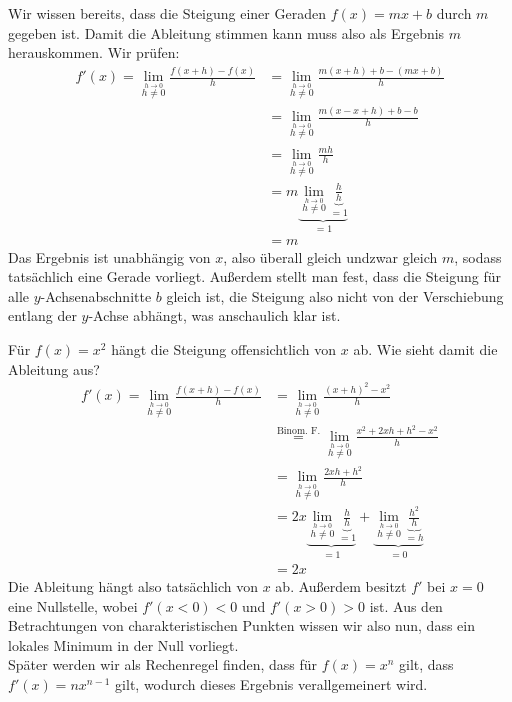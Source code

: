 \documentclass[../../main.tex]{subfiles}
\begin{document}
    \begin{example} \label{bsp:geradenAbleitungBeispiel}
        Wir wissen bereits, dass die Steigung einer Geraden $f(x) = mx + b$ durch $m$ gegeben ist. Damit die Ableitung stimmen kann muss also als Ergebnis $m$ herauskommen. Wir prüfen:
        \begin{align*}
        f'(x) = \lim\limits_{\stackrel{h\to 0}{h\neq 0}}\frac{f(x+h)-f(x)}{h} &= \lim\limits_{\stackrel{h\to 0}{h\neq 0}}\frac{m(x+h)+b-(mx+b)}{h}\\
        &= \lim\limits_{\stackrel{h\to 0}{h\neq 0}}\frac{m(x-x+h)+b-b}{h}\\
        &= \lim\limits_{\stackrel{h\to 0}{h\neq 0}}\frac{mh}{h}\\
        &= m\underbrace{\lim\limits_{\stackrel{h\to 0}{h\neq 0}}\underbrace{\frac{h}{h}}_{=1}}_{=1}\\
        &= m
        \end{align*}
        Das Ergebnis ist unabhängig von $x$, also überall gleich undzwar gleich $m$, sodass tatsächlich eine Gerade vorliegt. Außerdem stellt man fest, dass die Steigung für alle $y$-Achsenabschnitte $b$ gleich ist, die Steigung also nicht von der Verschiebung entlang der $y$-Achse abhängt, was anschaulich klar ist.
    \end{example}
    \begin{example}
        Für $f(x) = x^2$ hängt die Steigung offensichtlich von $x$ ab. Wie sieht damit die Ableitung aus?
        \begin{align*}
        f'(x) = \lim\limits_{\stackrel{h\to 0}{h\neq 0}}\frac{f(x+h)-f(x)}{h} &= \lim\limits_{\stackrel{h\to 0}{h\neq 0}}\frac{(x+h)^2-x^2}{h}\\
        &\stackrel{\text{Binom. F.}}{=} \lim\limits_{\stackrel{h\to 0}{h\neq 0}}\frac{x^2+2xh+h^2-x^2}{h}\\
        &= \lim\limits_{\stackrel{h\to 0}{h\neq 0}}\frac{2xh + h^2}{h}\\
        &= 2x\underbrace{\lim\limits_{\stackrel{h\to 0}{h\neq 0}}\underbrace{\frac{h}{h}}_{=1}}_{=1} + \underbrace{\lim\limits_{\stackrel{h\to 0}{h\neq 0}}\underbrace{\frac{h^2}{h}}_{=h}}_{=0}\\
        &= 2x
        \end{align*}
        Die Ableitung hängt also tatsächlich von $x$ ab. Außerdem besitzt $f'$ bei $x=0$ eine Nullstelle, wobei $f'(x<0)<0$ und $f'(x>0)>0$ ist. Aus den Betrachtungen von charakteristischen Punkten wissen wir also nun, dass ein lokales Minimum in der Null vorliegt.\\ Später werden wir als Rechenregel finden, dass für $f(x) = x^n$ gilt, dass $f'(x) = nx^{n-1}$ gilt, wodurch dieses Ergebnis verallgemeinert wird.
    \end{example}
\end{document}
